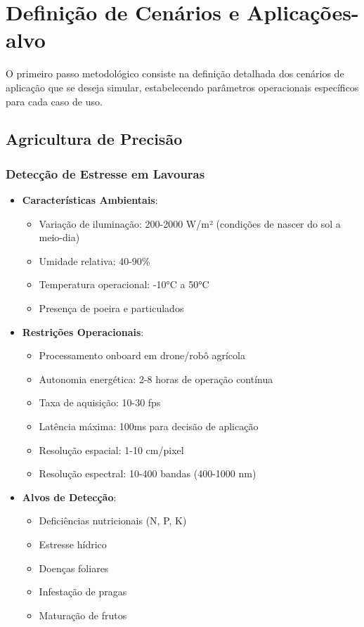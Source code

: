 \section{Definição de Cenários e Aplicações-alvo}\label{sec:cenarios_aplicacoes}

O primeiro passo metodológico consiste na definição detalhada dos cenários de aplicação que se deseja simular, estabelecendo parâmetros operacionais específicos para cada caso de uso.

\subsection{Agricultura de Precisão}

\subsubsection{Detecção de Estresse em Lavouras}
\begin{itemize}
    \item \textbf{Características Ambientais}:
    \begin{itemize}
        \item Variação de iluminação: 200-2000 W/m² (condições de nascer do sol a meio-dia)
        \item Umidade relativa: 40-90\%
        \item Temperatura operacional: -10°C a 50°C
        \item Presença de poeira e particulados
    \end{itemize}
    
    \item \textbf{Restrições Operacionais}:
    \begin{itemize}
        \item Processamento onboard em drone/robô agrícola
        \item Autonomia energética: 2-8 horas de operação contínua
        \item Taxa de aquisição: 10-30 fps
        \item Latência máxima: 100ms para decisão de aplicação
        \item Resolução espacial: 1-10 cm/pixel
        \item Resolução espectral: 10-400 bandas (400-1000 nm)
    \end{itemize}
    
    \item \textbf{Alvos de Detecção}:
    \begin{itemize}
        \item Deficiências nutricionais (N, P, K)
        \item Estresse hídrico
        \item Doenças foliares
        \item Infestação de pragas
        \item Maturação de frutos
    \end{itemize}
\end{itemize}

